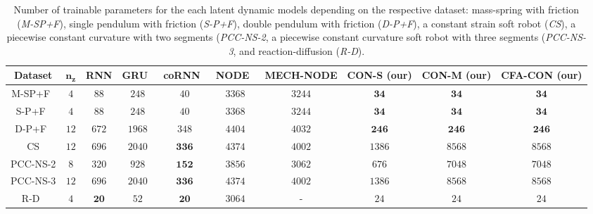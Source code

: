 \begin{landscape}
\begin{table}
    \centering
    \begin{small}
    \setlength\tabcolsep{2.5pt}
    \begin{tabular}{c|c|c|c|c|c|c|c|c|c}
        \toprule
        \textbf{Dataset} & $\mathbf{n_z}$ & \textbf{RNN} & \textbf{GRU}~\cite{cho2014learning} & \textbf{coRNN}~\cite{rusch2020coupled} & \textbf{NODE}~\cite{chen2018neural} & \textbf{MECH-NODE} & \textbf{CON-S (our)} & \textbf{CON-M (our)} & \textbf{CFA-CON (our)}\\
        \midrule
        M-SP+F~\cite{botev2021priors} & $4$ & $88$ & $248$ & $40$ & $3368$ & $3244$ & $\mathbf{34}$ & $\mathbf{34}$ & $\mathbf{34}$\\
        S-P+F~\cite{botev2021priors} & $4$ & $88$ & $248$ & $40$ & $3368$ & $3244$ & $\mathbf{34}$ & $\mathbf{34}$ & $\mathbf{34}$\\
        D-P+F~\cite{botev2021priors} & $12$ & $672$ & $1968$ & $348$ & $4404$ & $4032$ & $\mathbf{246}$ & $\mathbf{246}$ & $\mathbf{246}$\\
        CS & $12$ & $696$ & $2040$ & $\mathbf{336}$ & $4374$ & $4002$ & $1386$ & $8568$ & $8568$\\
        PCC-NS-2 & $8$ & $320$ & $928$ & $\mathbf{152}$ & $3856$ & $3062$ & $676$ & $7048$ & $7048$\\
        PCC-NS-3 & $12$ & $696$ & $2040$ & $\mathbf{336}$ & $4374$ & $4002$ & $1386$ & $8568$ & $8568$\\
        R-D~\cite{champion2019data} & $4$ & $\mathbf{20}$ & $52$ & $\mathbf{20}$ & $3064$ & - & $24$ & $24$ & $24$\\
        \bottomrule
    \end{tabular}
    \end{small}
    \caption{Number of trainable parameters for the each latent dynamic models depending on the respective dataset: mass-spring with friction (\emph{M-SP+F}), single pendulum with friction (\emph{S-P+F}), double pendulum with friction (\emph{D-P+F}), a constant strain soft robot (\emph{CS}), a piecewise constant curvature with two segments (\emph{PCC-NS-2}, a piecewise constant curvature soft robot with three segments (\emph{PCC-NS-3}, and reaction-diffusion (\emph{R-D}).}
    \label{tab:con:latent_dynamics_number_of_parameters}
\end{table}
\end{landscape}

